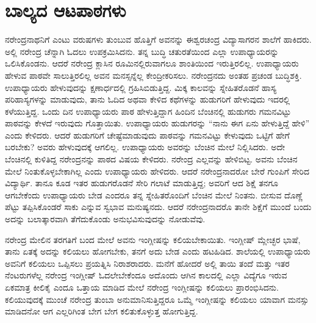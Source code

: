 
\chapter{ಬಾಲ್ಯದ ಆಟಪಾಠಗಳು }

ನರೇಂದ್ರನಾಥನಿಗೆ ಎಂಟು ವರುಷಗಳು ತುಂಬುವ ಹೊತ್ತಿಗೆ ಅವನನ್ನು ಈಶ್ವರಚಂದ್ರ ವಿದ್ಯಾಸಾಗರನ ಶಾಲೆಗೆ ಹಾಕಿದರು. ಅಲ್ಲಿ ನರೇಂದ್ರ ಚೆನ್ನಾಗಿ ಓದಲು ಉಪಕ್ರಮಿಸಿದನು. ತನ್ನ ಬುದ್ಧಿ ಚತುರತೆಯಿಂದ ಎಲ್ಲಾ ಉಪಾಧ್ಯಾಯರನ್ನು ಒಲಿಸಿಕೊಂಡನು. ಆದರೆ ನರೇಂದ್ರ ಕ್ಲಾಸಿನ ರೂಮಿನಲ್ಲಿರುವಾಗಲೂ ಶಾಂತಿಯಿಂದ ಇರುತ್ತಿರಲಿಲ್ಲ. ಉಪಾಧ್ಯಾಯರು ಹೇಳುವ ಪಾಠವೇ ಸಾಲುತ್ತಿರಲಿಲ್ಲ ಅವನ ಮನಸ್ಸನ್ನೆಲ್ಲ ಕೇಂದ್ರೀಕರಿಸಲು. ನರೇಂದ್ರನದು ಅಂತಹ ಪ್ರಚಂಡ ಬುದ್ಧಿಶಕ್ತಿ. ಉಪಾಧ್ಯಾಯರು ಹೇಳುವುದನ್ನು ಕ್ಷಣಾರ್ಧದಲ್ಲಿ ಗ್ರಹಿಸಿಬಿಡುತ್ತಿದ್ದ. ಮಿಕ್ಕ ಕಾಲವನ್ನು ಸ್ನೇಹಿತರೊಡನೆ ಹಾಸ್ಯ ಪರಿಹಾಸ್ಯಗಳನ್ನು ಮಾಡುವುದು, ತಾನು ಓದಿದ ಅಥವಾ ಕೇಳಿದ ಕಥೆಗಳನ್ನು ಹುಡುಗರಿಗೆ ಹೇಳುವುದು ಇದರಲ್ಲಿ ಕಳೆಯುತ್ತಿದ್ದ. ಒಂದು ದಿನ ಉಪಾಧ್ಯಾಯರು ಪಾಠ ಹೇಳುತ್ತಿದ್ದಾಗ ಹಿಂದಿನ ಬೆಂಚಿನಲ್ಲಿ ಹುಡುಗರು ಗಮನವಿಟ್ಟು ಪಾಠವನ್ನು ಕೇಳದೆ ಇರುವುದು ಗೊತ್ತಾಯಿತು. ಉಪಾಧ್ಯಾಯರು ಹುಡುಗರನ್ನು “ನಾನು ಈಗ ಏನು ಹೇಳುತ್ತಿದ್ದೆ ಹೇಳಿ” ಎಂದು ಕೇಳಿದರು. ಆದರೆ ಹುಡುಗರಿಗೆ ಚೇಷ್ಟೆಮಾಡುವುದು ಪಾಠವನ್ನು ಗಮನವಿಟ್ಟು ಕೇಳುವುದು ಒಟ್ಟಿಗೆ ಹೇಗೆ ಬರಬೇಕು? ಅವರು ಹೇಳುವುದಕ್ಕೆ ಆಗಲಿಲ್ಲ. ಉಪಾಧ್ಯಾಯರು ಅವರನ್ನು ಬೆಂಚಿನ ಮೇಲೆ ನಿಲ್ಲಿಸಿದರು. ಅದೇ ಬೆಂಚಿನಲ್ಲಿ ಕುಳಿತಿದ್ದ ನರೇಂದ್ರನನ್ನು ಪಾಠದ ವಿಷಯ ಕೇಳಿದರು. ನರೇಂದ್ರ ಎಲ್ಲವನ್ನು ಹೇಳಿಬಿಟ್ಟ. ಅವನು ಬೆಂಚಿನ ಮೇಲೆ ನಿಂತುಕೊಳ್ಳಬೇಕಾಗಿಲ್ಲ ಎಂದು ಉಪಾಧ್ಯಾಯರು ಹೇಳಿದರು. ಆದರೆ ನರೇಂದ್ರನಾದರೋ ಬೇರೆ ಗುಂಪಿಗೆ ಸೇರಿದ ವಿದ್ಯಾರ್ಥಿ. ತಾನೂ ಕೂಡ ಇತರ ಹುಡುಗರೊಡನೆ ಸೇರಿ ಗಲಾಟೆ ಮಾಡುತ್ತಿದ್ದ; ಅವರಿಗೆ ಆದ ಶಿಕ್ಷೆ ತನಗೂ ಆಗಬೇಕೆಂದು ಉಪಾಧ್ಯಾಯರು ಬೇಡ ಎಂದರೂ ತನ್ನ ಸ್ನೇಹಿತರೊಂದಿಗೆ ಬೆಂಚಿನ ಮೇಲೆ ನಿಂತನು. ಬೀಸುವ ದೊಣ್ಣೆ ಪೆಟ್ಟು ತಪ್ಪಿಸಿಕೊಂಡರೆ ಸಾಕು ಎನ್ನುವ ಸ್ವಭಾವ ಮನುಷ್ಯನದು. ಆದರೆ ನರೇಂದ್ರನಾದರೊ ತಾನೇ ಶಿಕ್ಷೆಗೆ ಮುಂದೆ ಬಂದು ಅದನ್ನು ಬಲಾತ್ಕಾರವಾಗಿ ತೆಗೆದುಕೊಂಡು ಅನುಭವಿಸುವುದನ್ನು ನೋಡುವೆವು.

ನರೇಂದ್ರ ಮೇಲಿನ ತರಗತಿಗೆ ಬಂದ ಮೇಲೆ ಅವನು ಇಂಗ್ಲೀಷನ್ನು ಕಲಿಯಬೇಕಾಯಿತು. ಇಂಗ್ಲೀಷ್ ಮ್ಲೇಚ್ಛರ ಭಾಷೆ, ತಾನು ಏತಕ್ಕೆ ಅದನ್ನು ಕಲಿಯಲು ಹೋಗಬೇಕು, ತನಗೆ ಅದು ಬೇಡ ಎಂದು ಹಟಹಿಡಿದ. ಶಾಲೆಯಲ್ಲಿ ಉಪಾಧ್ಯಾಯರು ಅವನಿಗೆ ಕಲಿಯಲು ಒಪ್ಪಿಸಲು ಪ್ರಯತ್ನಿಸಿ ನಿರಾಶರಾದರು. ಮನೆಗೆ ಹೋದರೆ ಅಲ್ಲಿ ತಾಯಿ ತಂದೆ ಮತ್ತು ಇತರ ನೆಂಟರುಗಳೆಲ್ಲ ನರೇಂದ್ರ ಇಂಗ್ಲೀಷ್ ಓದಲೇಬೇಕೆಂದೂ ಅದೊಂದು ಆಗಿನ ಕಾಲದಲ್ಲಿ ಎಲ್ಲಾ ವಿದ್ಯೆಗೂ ಇರುವ ಏಕಮಾತ್ರ ಕೀಲಿಕೈ ಎಂದೂ ಒತ್ತಾಯ ಮಾಡಿದ ಮೇಲೆ ನರೇಂದ್ರ ಇಂಗ್ಲೀಷನ್ನು ಕಲಿಯಲು ಪ್ರಾರಂಭಿಸಿದನು. ಕಲಿಯುವುದಕ್ಕೆ ಮುಂಚೆ ನರೇಂದ್ರ ತುಂಬಾ ಅನುಮಾನಿಸುತ್ತಿದ್ದರೂ ಒಮ್ಮೆ ಇಂಗ್ಲೀಷನ್ನು ಕಲಿಯಲು ಯಾವಾಗ ಮನಸ್ಸು ಮಾಡಿದನೋ ಆಗ ಎಲ್ಲರಿಗಿಂತ ಬೇಗ ಬೇಗ ಕಲಿತುಕೊಳ್ಳುತ್ತ ಹೋಗುತ್ತಿದ್ದ.

